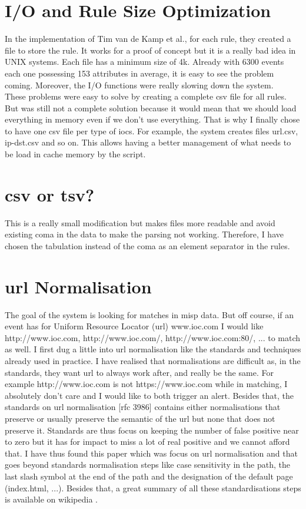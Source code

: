 \documentclass{eplmastersthesis}
\begin{document}
\section{I/O and Rule Size Optimization}
In the implementation of Tim van de Kamp et al., for each rule, they created a file to store the rule. 
It works for a proof of concept but it is a really bad idea in UNIX systems. Each file has a minimum size of 4k. Already with 6300 events each one possessing 153 attributes in average, it is easy to see the problem coming. Moreover, the I/O functions were really slowing down the system.\\

These problems were easy to solve by creating a complete \gls{csv} file for all rules. But was still not a complete solution because it would mean that we should load everything in memory even if we don't use everything. That is why I finally chose to have one \gls{csv} file per type of \glspl{ioc}. For example, the system creates files url.csv, ip-dst.csv and so on. This allows having a better management of what needs to be load in cache memory by the script.

\section{\gls{csv} or \gls{tsv}?}
This is a really small modification but makes files more readable and avoid existing coma in the data to make the parsing not working.
Therefore, I have chosen the tabulation instead of the coma as an element separator in the rules.

\section{\gls{url} Normalisation}
The goal of the system is looking for matches in \gls{misp} data. But off course, if an event has for Uniform Resource Locator (\gls{url}) www.ioc.com I would like http://www.ioc.com, http://www.ioc.com/, http://www.ioc.com:80/, ... to match as well.
I first dug a little into \gls{url} normalisation like the standards and techniques already used in practice. I have realised that normalisations are difficult as, in the standards, they want \gls{url} to always work after, and really be the same. For example http://www.ioc.com is not https://www.ioc.com while in matching, I absolutely don't care and I would like to both trigger an alert.
Besides that, the standards on \gls{url} normalisation [\gls{rfc} 3986] contains either normalisations that preserve or usually preserve the semantic of the \gls{url} but none that does not preserve it.
Standards are thus focus on keeping the number of false positive near to zero but it has for impact to miss a lot of real positive and we cannot afford that.
I have thus found this paper \cite{lee2005url} which was focus on \gls{url} normalisation and that goes beyond standards normalisation steps like case sensitivity in the path, the last slash symbol at the end of the path and the designation of the default page (index.html, ...).
Besides that, a great summary of all these standardisations steps is available on wikipedia \cite{wikiNormalizationURL}.\\
\end{document}
